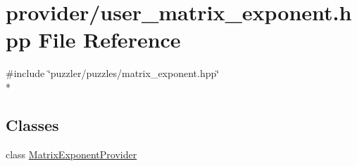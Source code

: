 \hypertarget{a00137}{}\section{provider/user\+\_\+matrix\+\_\+exponent.hpp File Reference}
\label{a00137}
{\ttfamily \#include \char`\"{}puzzler/puzzles/matrix\+\_\+exponent.\+hpp\char`\"{}}\\*
\subsection*{Classes}
\begin{DoxyCompactItemize}
\item 
class \hyperlink{a00017}{Matrix\+Exponent\+Provider}
\end{DoxyCompactItemize}
